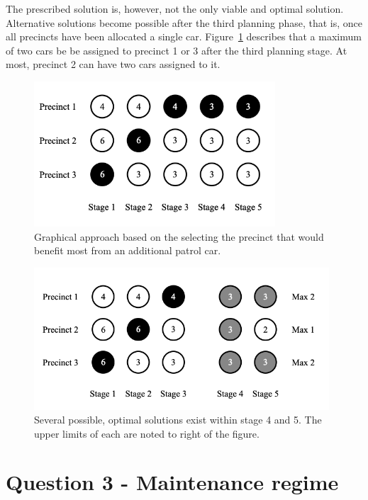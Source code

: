 \documentclass[a4paper,11pt]{article}
\begin{document}
The prescribed solution is, however, not the only viable and optimal solution. Alternative solutions become possible after the third planning phase, that is, once all precincts have been allocated a single car. Figure~\ref{q2fig:many} describes that a maximum of two cars be be assigned to precinct 1 or 3 after the third planning stage. At most, precinct 2 can have two cars assigned to it. 

\begin{figure}[h]
\includegraphics[width=9cm]{q2Solution.png}
\centering
\caption{Graphical approach based on the selecting the precinct that would benefit most from an additional patrol car.}
\end{figure}





\begin{figure}[h]
\includegraphics[width=11cm]{q2Many.png}
\centering
\caption{Several possible, optimal solutions exist within stage 4 and 5. The upper limits of each are noted to right of the figure.}
\label{q2fig:many}
\end{figure}


\newpage
\section{Question 3 - Maintenance regime}
\end{document}
